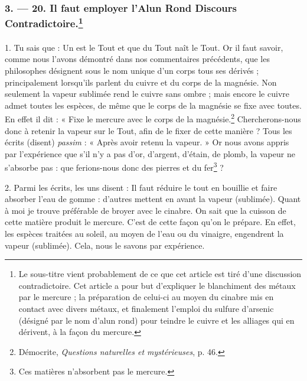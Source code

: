 \documentclass[landscape, a4paper, 11pt, oneside, polutonikogreek, french]{article}
\begin{document}
\bigskip
\centerline{\EightStarTaper}
\centerline{\EightStarTaper\EightStarTaper}
\bigskip

\subsubsection[3. --- 20. Il faut employer l'Alun Rond Discours Contradictoire.]{3. --- 20. Il faut employer l'Alun Rond Discours Contradictoire.\footnote{Le sous-titre vient probablement de ce que cet article est tiré d'une discussion contradictoire. Cet article a pour but d'expliquer le blanchiment des métaux par le mercure ; la préparation de celui-ci au moyen du cinabre mis en contact avec divers métaux, et finalement l'emploi du sulfure d'arsenic (désigné par le nom d'alun rond) pour teindre le cuivre et les alliages qui en dérivent, à la façon du mercure.}}
\paragraph{}
1. Tu sais que : Un est le Tout et que du Tout naît le Tout. Or il faut savoir, comme nous l'avons démontré dans nos commentaires précédents, que les philosophes désignent sous le nom unique d'un corps tous ses dérivés ; principalement lorsqu'ils parlent du cuivre et du corps de la magnésie. Non seulement la vapeur sublimée rend le cuivre sans ombre ; mais encore le cuivre admet toutes les espèces, de même que le corps de la magnésie se fixe avec toutes. En effet il dit : « Fixe le mercure avec le corps de la magnésie.\footnote{Démocrite, \emph{Questions naturelles et mystérieuses}, p. 46.} Chercherons-nous donc à retenir la vapeur sur le Tout, afin de le fixer de cette manière ? Tous les écrits (disent) \emph{passim} : « Après avoir retenu la vapeur. » Or nous avons appris par l'expérience que s'il n'y a pas d'or, d'argent, d'étain, de plomb, la vapeur ne s'absorbe pas : que ferions-nous donc des pierres et du fer\footnote{Ces matières n'absorbent pas le mercure.} ?

2. Parmi les écrits, les uns disent : Il faut réduire le tout en bouillie et faire absorber l'eau de gomme : d'autres mettent en avant la vapeur (sublimée). Quant à moi je trouve préférable de broyer avec le cinabre. On sait que la cuisson de cette matière produit le mercure. C'est de cette façon qu'on le prépare. En effet, les espèces traitées au soleil, au moyen de l'eau ou du vinaigre, engendrent la vapeur (sublimée). Cela, nous le savons par expérience.
\end{document}
